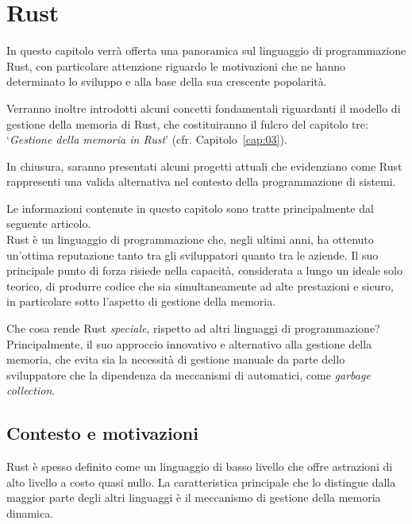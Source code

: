 
\chapter{Rust}\label{cap:02}

In questo capitolo verrà offerta una panoramica sul linguaggio di programmazione Rust, con particolare attenzione riguardo
le motivazioni che ne hanno determinato lo sviluppo e alla base della sua crescente popolarità.

Verranno inoltre introdotti alcuni concetti fondamentali riguardanti il modello di gestione della memoria di Rust, 
che costituiranno il fulcro del capitolo tre: `\textit{Gestione della memoria in Rust}' (cfr. Capitolo~\ref{cap:03}).

In chiusura, saranno presentati alcuni progetti attuali che evidenziano come Rust rappresenti una valida alternativa nel contesto della programmazione di sistemi.

Le informazioni contenute in questo capitolo sono tratte principalmente dal seguente articolo\cite{rust-2023-interview}.
\vspace{15pt}\\
\noindent Rust è un linguaggio di programmazione che, negli ultimi anni, ha ottenuto un'ottima reputazione  
tanto tra gli sviluppatori quanto tra le aziende. Il suo principale punto di forza risiede nella 
capacità, considerata a lungo un ideale solo teorico, di produrre codice che sia simultaneamente 
ad alte prestazioni e sicuro, in particolare sotto l'aspetto di gestione della memoria.

Che cosa rende Rust \textit{speciale}, rispetto ad altri linguaggi di programmazione? Principalmente, il suo approccio innovativo e alternativo alla gestione della memoria, che evita sia la necessità di gestione manuale da parte dello sviluppatore che la dipendenza da meccanismi di automatici, come \textit{garbage collection}.

\section{Contesto e motivazioni}
Rust è spesso definito come un linguaggio di basso livello 
che offre astrazioni di alto livello a costo quasi nullo.
La caratteristica principale che lo distingue dalla maggior parte degli altri linguaggi è il meccanismo
 di gestione della memoria dinamica. 

